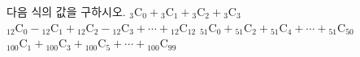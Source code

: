 다음 식의 값을 구하시오.
 ${}_3\mathrm{C}_0+{}_3\mathrm{C}_1+{}_3\mathrm{C}_2+{}_3\mathrm{C}_3$
 ${}_{12}\mathrm{C}_0-{}_{12}\mathrm{C}_1+{}_{12}\mathrm{C}_2-{}_{12}\mathrm{C}_3+\cdots+{}_{12}\mathrm{C}_{12}$
 ${}_{51}\mathrm{C}_0+{}_{51}\mathrm{C}_2+{}_{51}\mathrm{C}_4+\cdots+{}_{51}\mathrm{C}_{50}$
 ${}_{100}\mathrm{C}_1+{}_{100}\mathrm{C}_3+{}_{100}\mathrm{C}_5+\cdots+{}_{100}\mathrm{C}_{99}$
